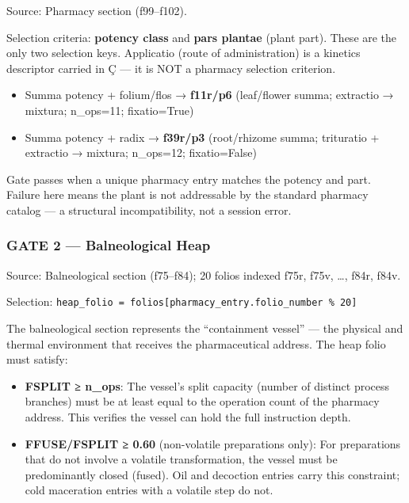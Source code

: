 \documentclass[12pt,a4paper]{article}
\begin{document}
Source: Pharmacy section (f99--f102).

Selection criteria: \textbf{potency class} and \textbf{pars plantae}
(plant part). These are the only two selection keys. Applicatio (route
of administration) is a kinetics descriptor carried in Ç --- it is NOT a
pharmacy selection criterion.

\begin{itemize}
\tightlist
\item
  Summa potency + folium/flos → \textbf{f11r/p6} (leaf/flower summa;
  extractio → mixtura; n\_ops=11; fixatio=True)
\item
  Summa potency + radix → \textbf{f39r/p3} (root/rhizome summa;
  trituratio + extractio → mixtura; n\_ops=12; fixatio=False)
\end{itemize}

Gate passes when a unique pharmacy entry matches the potency and part.
Failure here means the plant is not addressable by the standard pharmacy
catalog --- a structural incompatibility, not a session error.

\hypertarget{gate-2-balneological-heap}{%
\subsubsection{GATE 2 --- Balneological
Heap}\label{gate-2-balneological-heap}}

Source: Balneological section (f75--f84); 20 folios indexed f75r, f75v,
\ldots, f84r, f84v.

Selection:
\texttt{heap\_folio\ =\ folios{[}pharmacy\_entry.folio\_number\ \%\ 20{]}}

The balneological section represents the ``containment vessel'' --- the
physical and thermal environment that receives the pharmaceutical
address. The heap folio must satisfy:

\begin{itemize}
\item
  \textbf{FSPLIT ≥ n\_ops}: The vessel's split capacity (number of
  distinct process branches) must be at least equal to the operation
  count of the pharmacy address. This verifies the vessel can hold the
  full instruction depth.
\item
  \textbf{FFUSE/FSPLIT ≥ 0.60} (non-volatile preparations only): For
  preparations that do not involve a volatile transformation, the vessel
  must be predominantly closed (fused). Oil and decoction entries carry
  this constraint; cold maceration entries with a volatile step do not.
\end{itemize}
\end{document}
